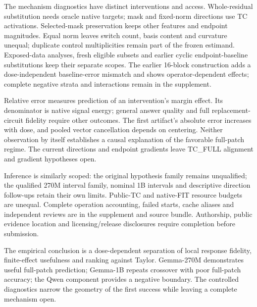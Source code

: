 \documentclass[11pt]{article}
\begin{document}
The mechanism diagnostics have distinct interventions and access. Whole-residual substitution needs oracle native targets; mask and fixed-norm directions use TC activations. Selected-mask preservation keeps other features and endpoint magnitudes. Equal norm leaves switch count, basis content and curvature unequal; duplicate control multiplicities remain part of the frozen estimand. Exposed-data analyses, fresh eligible subsets and earlier cyclic endpoint-baseline substitutions keep their separate scopes. The earlier 16-block construction adds a dose-independent baseline-error mismatch and shows operator-dependent effects; complete negative strata and interactions remain in the supplement.

Relative error measures prediction of an intervention's margin effect. Its denominator is native signal energy; general answer quality and full replacement-circuit fidelity require other outcomes. The first artifact's absolute error increases with dose, and pooled vector cancellation depends on centering. Neither observation by itself establishes a causal explanation of the favorable full-patch regime. The current directions and endpoint gradients leave TC\_FULL alignment and gradient hypotheses open.

Inference is similarly scoped: the original hypothesis family remains unqualified; the qualified 270M interval family, nominal 1B intervals and descriptive direction follow-ups retain their own limits. Public-TC and native-FIT resource budgets are unequal. Complete operation accounting, failed starts, cache aliases and independent reviews are in the supplement and source bundle. Authorship, public evidence location and licensing/release disclosures require completion before submission.

The empirical conclusion is a dose-dependent separation of local response fidelity, finite-effect usefulness and ranking against Taylor. Gemma-270M demonstrates useful full-patch prediction; Gemma-1B repeats crossover with poor full-patch accuracy; the Qwen component provides a negative boundary. The controlled diagnostics narrow the geometry of the first success while leaving a complete mechanism open.

\clearpage
\small


\end{document}
